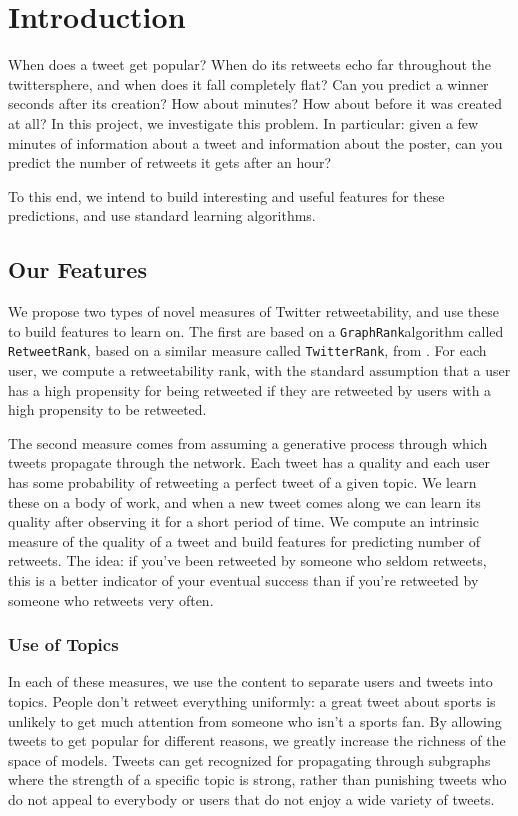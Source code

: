 \section{Introduction}

When does a tweet get popular?  
When do its retweets echo far throughout the twittersphere, and when does  it fall completely flat?
Can you predict a winner seconds after its creation? How about minutes?
How about before it was created at all?
In this project, we investigate this problem.
In particular: given a few minutes of information about a tweet and information about the poster, can you predict the number of retweets it gets after an hour?

To this end, we intend to build interesting and useful features for these predictions, and use standard learning algorithms.  

\subsection{Our Features}

We propose two types of novel measures of Twitter retweetability, and use these to build features to learn on.
The first are based on a \texttt{GraphRank}algorithm called \texttt{RetweetRank}, based on a similar measure called \texttt{TwitterRank}, from  \cite{Weng:2010:TFT:1718487.1718520}.  
For each user, we compute a retweetability rank, with the standard assumption that a user has a high propensity for being retweeted if they are retweeted by users with a high propensity to be retweeted.  

The second measure comes from assuming a generative process through which tweets propagate through the network.
Each tweet has a quality and each user has some probability of retweeting a perfect tweet of a given topic.
We learn these on a body of work, and when a new tweet comes along we can learn its quality after observing it for a short period of time.  We compute an intrinsic measure of the quality of a tweet and build features for predicting number of retweets.  The idea: if you've been retweeted by someone who seldom retweets, this is a better indicator of your eventual success than if you're retweeted by someone who retweets very often.   

\subsubsection{Use of Topics}

In each of these measures, we use the content to separate users and tweets into topics.
People don't retweet everything uniformly: a great tweet about sports is unlikely to get much attention from someone who isn't a sports fan.
By allowing tweets to get popular for different reasons, we greatly increase the richness of the space of models.
Tweets can get recognized for propagating through subgraphs where the strength of a specific topic is strong, rather than punishing tweets who do not appeal to everybody or users that do not enjoy a wide variety of tweets.  


